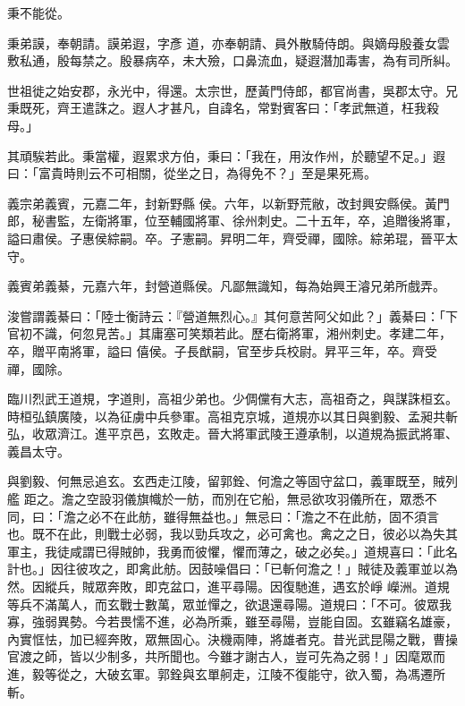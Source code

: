 \begin{pinyinscope}
 秉不能從。



 秉弟謨，奉朝請。謨弟遐，字彥
 道，亦奉朝請、員外散騎侍朗。與嫡母殷養女雲敷私通，殷每禁之。殷暴病卒，未大殮，口鼻流血，疑遐潛加毒害，為有司所糾。



 世祖徙之始安郡，永光中，得還。太宗世，歷黃門侍郎，都官尚書，吳郡太守。兄秉既死，齊王遣誅之。遐人才甚凡，自諱名，常對賓客曰：「孝武無道，枉我殺母。」



 其頑騃若此。秉當權，遐累求方伯，秉曰：「我在，用汝作州，於聽望不足。」遐曰：「富貴時則云不可相關，從坐之日，為得免不？」至是果死焉。



 義宗弟義賓，元嘉二年，封新野縣
 侯。六年，以新野荒敝，改封興安縣侯。黃門郎，秘書監，左衛將軍，位至輔國將軍、徐州刺史。二十五年，卒，追贈後將軍，謚曰肅侯。子惠侯綜嗣。卒。子憲嗣。昇明二年，齊受禪，國除。綜弟琨，晉平太守。



 義賓弟義綦，元嘉六年，封營道縣侯。凡鄙無識知，每為始興王濬兄弟所戲弄。



 浚嘗謂義綦曰：「陸士衡詩云：『營道無烈心。』其何意苦阿父如此？」義綦曰：「下官初不識，何忽見苦。」其庸塞可笑類若此。歷右衛將軍，湘州刺史。孝建二年，卒，贈平南將軍，謚曰
 僖侯。子長猷嗣，官至步兵校尉。昇平三年，卒。齊受禪，國除。



 臨川烈武王道規，字道則，高祖少弟也。少倜儻有大志，高祖奇之，與謀誅桓玄。時桓弘鎮廣陵，以為征虜中兵參軍。高祖克京城，道規亦以其日與劉毅、孟昶共斬弘，收眾濟江。進平京邑，玄敗走。晉大將軍武陵王遵承制，以道規為振武將軍、義昌太守。



 與劉毅、何無忌追玄。玄西走江陵，留郭銓、何澹之等固守盆口，義軍既至，賊列艦
 距之。澹之空設羽儀旗幟於一舫，而別在它船，無忌欲攻羽儀所在，眾悉不同，曰：「澹之必不在此舫，雖得無益也。」無忌曰：「澹之不在此舫，固不須言也。既不在此，則戰士必弱，我以勁兵攻之，必可禽也。禽之之日，彼必以為失其軍主，我徒咸謂已得賊帥，我勇而彼懼，懼而薄之，破之必矣。」道規喜曰：「此名計也。」因往彼攻之，即禽此舫。因鼓噪倡曰：「已斬何澹之！」賊徒及義軍並以為然。因縱兵，賊眾奔敗，即克盆口，進平尋陽。因復馳進，遇玄於崢
 嶸洲。道規等兵不滿萬人，而玄戰士數萬，眾並憚之，欲退還尋陽。道規曰：「不可。彼眾我寡，強弱異勢。今若畏懦不進，必為所乘，雖至尋陽，豈能自固。玄雖竊名雄豪，內實恇怯，加已經奔敗，眾無固心。決機兩陣，將雄者克。昔光武昆陽之戰，曹操官渡之師，皆以少制多，共所聞也。今雖才謝古人，豈可先為之弱！」因麾眾而進，毅等從之，大破玄軍。郭銓與玄單舸走，江陵不復能守，欲入蜀，為馮遷所斬。




\end{pinyinscope}
